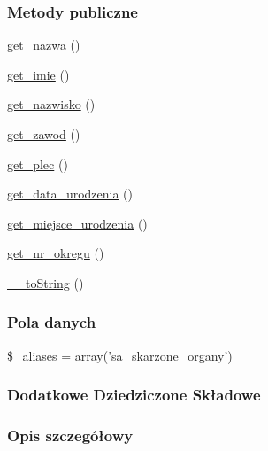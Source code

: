\subsubsection*{Metody publiczne}
\begin{DoxyCompactItemize}
\item 
\hyperlink{classep___s_a___skarzony___organ_ac0818f0049d7b84f08f77128f54cee36}{get\-\_\-nazwa} ()
\item 
\hyperlink{classep___s_a___skarzony___organ_ac4b0c85dc2a130038f2d118dbd0c3d77}{get\-\_\-imie} ()
\item 
\hyperlink{classep___s_a___skarzony___organ_abdd1d7ff92508da7f748ba1feec97af0}{get\-\_\-nazwisko} ()
\item 
\hyperlink{classep___s_a___skarzony___organ_af80ca8310b60004454dd02a387deaa2c}{get\-\_\-zawod} ()
\item 
\hyperlink{classep___s_a___skarzony___organ_ac7f9af5c3fa024e4c26a7b6bd4ce4bb4}{get\-\_\-plec} ()
\item 
\hyperlink{classep___s_a___skarzony___organ_a880b240cd2d8c336fd1709bf0cb1ae2c}{get\-\_\-data\-\_\-urodzenia} ()
\item 
\hyperlink{classep___s_a___skarzony___organ_ac57c08ec5e394a19c5bd9280c8376182}{get\-\_\-miejsce\-\_\-urodzenia} ()
\item 
\hyperlink{classep___s_a___skarzony___organ_a2645a9f0aa5b0ccc482943348c033d0a}{get\-\_\-nr\-\_\-okregu} ()
\item 
\hyperlink{classep___s_a___skarzony___organ_a7516ca30af0db3cdbf9a7739b48ce91d}{\-\_\-\-\_\-to\-String} ()
\end{DoxyCompactItemize}
\subsubsection*{Pola danych}
\begin{DoxyCompactItemize}
\item 
\hyperlink{classep___s_a___skarzony___organ_ab4e31d75f0bc5d512456911e5d01366b}{\$\-\_\-aliases} = array('sa\-\_\-skarzone\-\_\-organy')
\end{DoxyCompactItemize}
\subsubsection*{Dodatkowe Dziedziczone Składowe}


\subsubsection{Opis szczegółowy}


